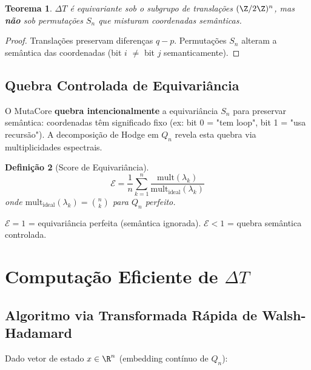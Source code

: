 \documentclass[11pt,a4paper]{article}
\newtheorem{theorem}{Teorema}[section]
\newtheorem{definition}[theorem]{Definição}
\newcommand{\DeltaT}{\Delta T}
\begin{document}
\begin{theorem}
$\DeltaT$ é equivariante sob o subgrupo de translações $(\Z/2\Z)^n$, mas \textbf{não} sob permutações $S_n$ que misturam coordenadas semânticas.
\end{theorem}

\begin{proof}
Translações preservam diferenças $q-p$. Permutações $S_n$ alteram a semântica das coordenadas (bit $i$ $\neq$ bit $j$ semanticamente).
\end{proof}

\subsection{Quebra Controlada de Equivariância}

O MutaCore \textbf{quebra intencionalmente} a equivariância $S_n$ para preservar semântica: coordenadas têm significado fixo (ex: bit 0 = "tem loop", bit 1 = "usa recursão"). A decomposição de Hodge em $Q_n$ revela esta quebra via multiplicidades espectrais.

\begin{definition}[Score de Equivariância]
\begin{equation}
    \mathcal{E} = \frac{1}{n} \sum_{k=1}^n \frac{\text{mult}(\lambda_k)}{\text{mult}_{\text{ideal}}(\lambda_k)}
\end{equation}
onde $\text{mult}_{\text{ideal}}(\lambda_k) = \binom{n}{k}$ para $Q_n$ perfeito.
\end{definition}

$\mathcal{E} = 1$ = equivariância perfeita (semântica ignorada). $\mathcal{E} < 1$ = quebra semântica controlada.

\section{Computação Eficiente de $\DeltaT$}

\subsection{Algoritmo via Transformada Rápida de Walsh-Hadamard}

Dado vetor de estado $x \in \R^n$ (embedding contínuo de $Q_n$):

\end{document}
